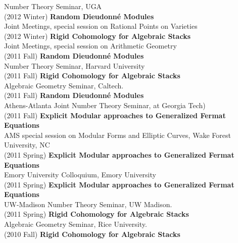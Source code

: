 \documentclass[margin,line]{res}
\begin{document}
\begin{resume}
Number Theory Seminar, UGA
\vspace{.05cm}\\
(2012 Winter) \textbf{Random Dieudonn\'e Modules}\\
Joint Meetings, special session on Rational Points on Varieties
\vspace{.05cm}\\
(2012 Winter) \textbf{Rigid Cohomology for Algebraic Stacks}\\
Joint Meetings, special session on Arithmetic Geometry
\vspace{.05cm}\\
(2011 Fall) \textbf{Random Dieudonn\'e Modules}\\
Number Theory Seminar, Harvard University
\vspace{.05cm}\\
(2011 Fall) \textbf{Rigid Cohomology for Algebraic Stacks}\\
Algebraic Geometry Seminar, Caltech.
\vspace{.05cm}\\
(2011 Fall) \textbf{Random Dieudonn\'e Modules}\\
Athens-Atlanta Joint Number Theory Seminar, at Georgia Tech)
\vspace{.05cm}\\
(2011 Fall) \textbf{Explicit Modular approaches to Generalized Fermat Equations}\\
AMS special session on Modular Forms and Elliptic Curves, Wake Forest University, NC
\vspace{.05cm}\\
(2011 Spring) \textbf{Explicit Modular approaches to Generalized Fermat Equations}\\
Emory University Colloquium, Emory University
\vspace{.05cm}\\
(2011 Spring) \textbf{Explicit Modular approaches to Generalized Fermat Equations}\\
 UW-Madison Number Theory Seminar, UW Madison.
\vspace{.05cm}\\
(2011 Spring) \textbf{Rigid Cohomology for Algebraic Stacks}\\
Algebraic Geometry Seminar, Rice University.
\vspace{.05cm}\\
(2010 Fall) \textbf{Rigid Cohomology for Algebraic Stacks}\\

\end{resume}
\end{document}
